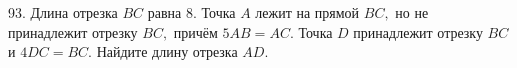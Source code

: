 93. Длина отрезка $BC$ равна 8. Точка $A$ лежит на прямой $BC,$ но не принадлежит отрезку $BC,$ причём $5AB=AC.$ Точка $D$ принадлежит отрезку $BC$ и $4DC=BC.$ Найдите длину отрезка $AD.$\\
